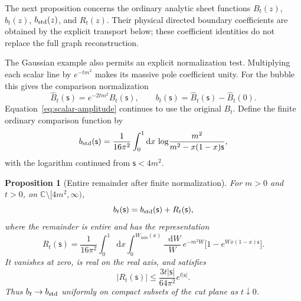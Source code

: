 \documentclass[final,5p,times,twocolumn,numbers,nopreprintline]{elsarticle}
\numberwithin{equation}{section}
\newtheorem{proposition}[theorem]{Proposition}
\theoremstyle{definition}
\theoremstyle{remark}
\newcommand{\dd}{\mathop{}\!\mathrm d}
\newcommand{\CC}{\mathbb C}
\newcommand{\sMand}{\mathsf{s}}
\begin{document}
The next proposition concerns the ordinary analytic sheet functions
\(B_t(z)\), \(b_t(z)\), \(b_{\rm std}(z)\), and \(R_t(z)\).
Their physical directed boundary coefficients are obtained by the
explicit transport below; these coefficient identities do not
replace the full graph reconstruction.

The Gaussian example also permits an explicit normalization test.
Multiplying each scalar line by \(e^{-tm^2}\) makes its massive
pole coefficient unity. For the bubble this gives the comparison
normalization
\begin{equation}
 \widehat B_t(\sMand)=e^{-2tm^2}B_t(\sMand),\qquad
 b_t(\sMand)=\widehat B_t(\sMand)-\widehat B_t(0).
 \label{eq:normalized-bubble}
\end{equation}
Equation~\eqref{eq:scalar-amplitude} continues to use the original
\(B_t\). Define the finite ordinary comparison function by
\begin{equation}
 b_{\rm std}(\sMand)
 =\frac1{16\pi^2}\int_0^1\dd x\,
   \log\!\frac{m^2}{m^2-x(1-x)\sMand},
 \label{eq:subtracted-standard-bubble}
\end{equation}
with the logarithm continued from \(\sMand<4m^2\).

\begin{proposition}[Entire remainder after finite normalization]
\label{prop:entire-bubble-remainder}
For \(m>0\) and \(t>0\), on
\(\CC\setminus[4m^2,\infty)\),
\begin{equation}
 b_t(\sMand)=b_{\rm std}(\sMand)+R_t(\sMand),
 \label{eq:bubble-entire-decomposition}
\end{equation}
where the remainder is entire and has the representation
\begin{equation}
 R_t(\sMand)
 =\frac1{16\pi^2}\int_0^1\dd x
   \int_0^{W_{\min}(x)}\frac{\dd W}{W}\,
       e^{-m^2W}\bigl[1-e^{Wx(1-x)\sMand}\bigr].
 \label{eq:entire-bubble-remainder}
\end{equation}
It vanishes at zero, is real on the real axis, and satisfies
\begin{equation}
 |R_t(\sMand)|
   \leq\frac{3t|\sMand|}{64\pi^2}e^{t|\sMand|}.
 \label{eq:entire-remainder-bound}
\end{equation}
Thus \(b_t\to b_{\rm std}\) uniformly on compact subsets of the
cut plane as \(t\downarrow0\).
\end{proposition}
\end{document}
